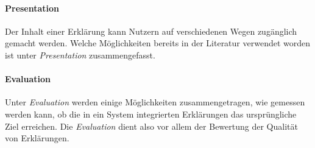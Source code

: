 \paragraph{Presentation} Der Inhalt einer Erklärung kann Nutzern auf verschiedenen Wegen zugänglich gemacht werden. Welche Möglichkeiten bereits in der Literatur verwendet worden ist unter \textit{Presentation} zusammengefasst.

\paragraph{Evaluation} Unter \textit{Evaluation} werden einige Möglichkeiten zusammengetragen, wie gemessen werden kann, ob die in ein System integrierten Erklärungen das ursprüngliche Ziel erreichen. Die \textit{Evaluation} dient also vor allem der Bewertung der Qualität von Erklärungen.







